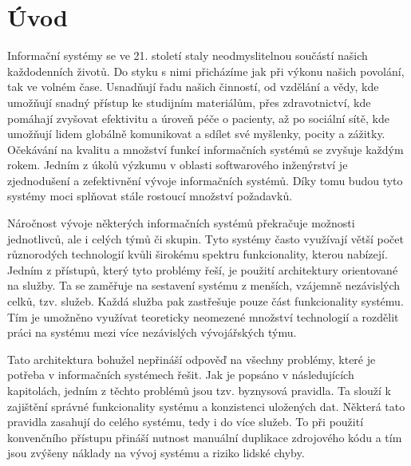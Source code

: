 
\chapter{Úvod}\label{ch:uvod}

Informační systémy se ve 21. století staly neodmyslitelnou součástí našich každodenních životů.
Do styku s nimi přicházíme jak při výkonu našich povolání, tak ve volném čase. Usnadňují
řadu našich činností, od vzdělání a vědy, kde umožňují snadný přístup ke studijním materiálům,
přes zdravotnictví, kde pomáhají zvyšovat efektivitu a úroveň péče o pacienty,
až po sociální sítě, kde umožňují lidem globálně komunikovat a sdílet své myšlenky, pocity a zážitky.
Očekávání na kvalitu a množství funkcí informačních systémů se zvyšuje každým rokem.
Jedním z úkolů výzkumu v oblasti softwarového inženýrství je zjednodušení a zefektivnění
vývoje informačních systémů. Díky tomu budou tyto systémy moci splňovat stále rostoucí množství požadavků.

Náročnost vývoje některých informačních systémů překračuje možnosti jednotlivců, ale
i celých týmů či skupin. Tyto systémy často využívají větší počet různorodých technologií kvůli
širokému spektru funkcionality, kterou nabízejí. Jedním z přístupů, který tyto problémy řeší,
je použití architektury orientované na služby. Ta se zaměřuje na sestavení systému z menších, vzájemně
nezávislých celků, tzv. služeb. Každá služba pak zastřešuje pouze část funkcionality systému.
Tím je umožněno využívat teoreticky neomezené množství technologií a rozdělit práci na systému mezi více nezávislých
vývojářských týmu.

Tato architektura bohužel nepřináší odpověď na všechny problémy, které je potřeba v informačních
systémech řešit. Jak je popsáno v následujících kapitolách, jedním z těchto problémů jsou tzv. byznysová
pravidla. Ta slouží k zajištění správné funkcionality systému a konzistenci uložených dat.
Některá tato pravidla zasahují do celého systému, tedy i do více služeb.
To při použití konvenčního přístupu přináší nutnost manuální duplikace zdrojového
kódu a tím jsou zvýšeny náklady na vývoj systému a riziko lidské chyby.


